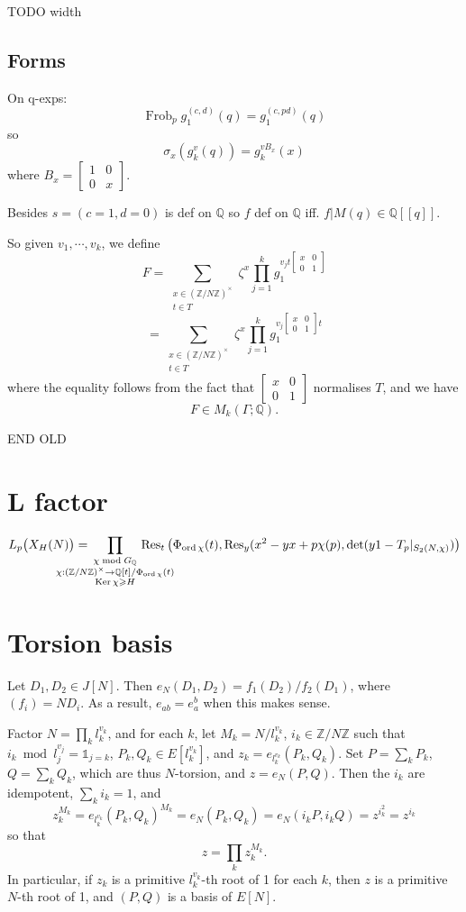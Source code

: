 \documentclass[12pt]{article}
\newcommand{\Z}{\mathbb{Z}}
\newcommand{\Q}{\mathbb{Q}}
\newcommand{\Ker}{\operatorname{Ker}}
\newcommand{\Res}{\operatorname{Res}}
\newcommand{\ord}{\operatorname{ord}}
\newcommand{\Frob}{\operatorname{Frob}}
\newcommand{\smat}[4]{\left[ \begin{smallmatrix} #1 & #2 \\ #3 & #4 \end{smallmatrix} \right]}
\theoremstyle{definition}
\begin{document}
TODO width

\subsection{Forms}

On  q-exps:
\[ \Frob_p g_1^{(c,d)}(q) = g_1^{(c,pd)}(q) \]
so
\[ \sigma_x (g_k^v (q) )= g_k^{v B_x} (x) \]
where $B_x = \smat{1}{0}{0}{x}$.
 
Besides $s=(c=1,d=0)$ is def on $\Q$ so $f$ def on $\Q$ iff. $f \vert M (q) \in \Q[[q]]$.

So given $v_1,\cdots,v_k$, we define
\[ F = \sum_{\substack{x \in (\Z/N\Z)^\times \\ t \in T}} \zeta^x \prod_{j=1}^k g_1^{v_j t \smat{x}{0}{0}{1} } \]
\[ = \sum_{\substack{x \in (\Z/N\Z)^\times \\ t \in T}} \zeta^x \prod_{j=1}^k g_1^{v_j  \smat{x}{0}{0}{1} t} \]
where the equality follows from the fact that  $\smat{x}{0}{0}{1}$ normalises $T$, and we have
\[ F \in M_k(\Gamma;\Q). \]

END OLD

\section{L factor}

\[ L_p\big(X_H(N)\big) = \hspace{-1cm} \prod_{\substack{\chi \bmod G_\Q \\ \chi : (\Z/N\Z)^\times \rightarrow \Q[t]/\Phi_{\ord \chi}(t) \\ \Ker \chi \geqslant H}} \hspace{-1cm} \Res_t\big( \Phi_{\ord \chi}(t),\Res_y(x^2-yx+p\chi(p), \det(y1-T_p \vert_{S_2(N,\chi)}) \big) \]

\section{Torsion basis}

Let $D_1, D_2 \in J[N]$. Then $e_N(D_1,D_2) = f_1(D_2)/f_2(D_1)$, where $(f_i) = N D_i$. As a result, $e_{ab} = e_a^b$ when this makes sense.

Factor $N = \prod_k l_k^{v_k}$, and for each $k$, let $M_k = N/l_k^{v_k}$, $i_k \in \Z/N\Z$ such that $i_k \bmod l_j^{v_j} = \mathds{1}_{j=k}$, $P_k, Q_k \in E[l_k^{v_k}]$, and $z_k = e_{l_k^{v_k}}(P_k,Q_k)$. Set $P = \sum_k P_k$, $Q = \sum_k Q_k$, which are thus $N$-torsion, and $z=e_N(P,Q)$. Then the $i_k$ are idempotent, $\sum_k i_k = 1$, and
\[ z_k^{M_k} = e_{l_k^{v_k}}(P_k,Q_k)^{M_k} = e_N(P_k,Q_k) = e_N(i_k P, i_k Q) = z ^{i_k^2} = z^{i_k} \]
so that
\[ z = \prod_k z_k^{M_k}. \]
In particular, if $z_k$ is a primitive $l_k^{v_k}$-th root of 1 for each $k$, then $z$ is a primitive $N$-th root of 1, and $(P,Q)$ is a basis of $E[N]$.
\end{document}
